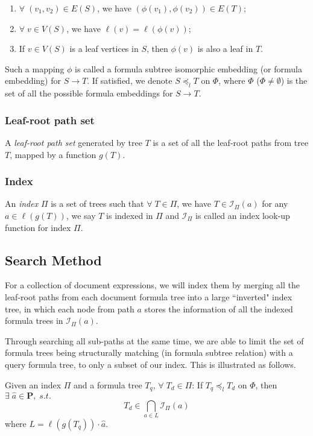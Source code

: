 \documentclass{acm_proc_article-sp}
\begin{document}
\begin{enumerate}
\item 
$\forall\; (v_1,v_2) \in E(S)$, we have $(\phi(v_1),\phi(v_2)) \in E(T)$;
\item
$\forall\; v \in V(S)$, we have $\ell(v) = \ell(\phi(v))$;
\item
If $v \in V(S)$ is a leaf vertices in $S$, then $\phi(v)$ is also a leaf in $T$.
\end{enumerate}
Such a mapping $\phi$ is called a formula subtree isomorphic embedding (or formula embedding) for $S \rightarrow T$. 
If satisfied, we denote $S \preceq_l T$ on $\Phi$, where $\Phi$ ($\Phi \neq \emptyset$) is the set of all the possible formula embeddings for $S \rightarrow T$.

\subsubsection{Leaf-root path set}
A \textit{leaf-root path set} generated by tree $T$ is a set of all the leaf-root paths from tree $T$, mapped by a function $g(T)$. 

\subsubsection{Index}
An \textit{index} $\Pi$ is a set of trees such that $\forall\; T \in \Pi$, we have $T \in \mathcal{I}_{\Pi}(a)$ for any $a \in \ell(g(T))$, we say $T$ is indexed in $\Pi$ and $\mathcal{I}_{\Pi}$ is called an index look-up function for index $\Pi$. 

\subsection{Search Method}
For a collection of document expressions, we will index them by merging all the leaf-root paths from each document formula tree into a large ``inverted" index tree, 
in which each node from path $a$ stores the information of all the indexed formula trees in $\mathcal{I}_{\Pi}(a)$.

Through searching all sub-paths at the same time, we are able to limit the set of formula trees being structurally matching (in formula subtree relation) with a query formula tree, to only a subset of our index. 
This is illustrated as follows.

Given an index $\Pi$ and a formula tree $T_q$, $\forall\; T_d \in \Pi$:
If $T_q \preceq_l T_d$ on $\Phi$, then $\exists\; \hat{a} \in \mathbf{P},\; s.t.$
$$
T_d \in \bigcap_{a \in L} \mathcal{I}_{\Pi}(a)
$$
where $L = \ell(g(T_q)) \cdot \hat{a}$.
\end{document}

